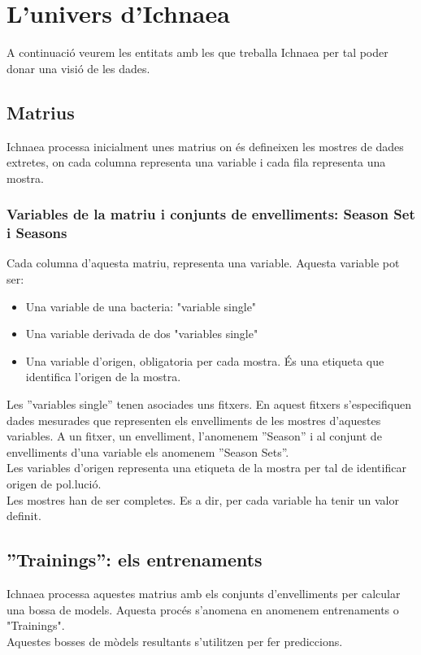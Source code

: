\section{L'univers d'Ichnaea}
A continuaci\'{o} veurem les entitats amb les que treballa Ichnaea per tal poder donar una visi\'{o} de les dades.

\subsection{Matrius}
\label{cha:backgroud:univers:matrius}
Ichnaea processa inicialment unes matrius on \'e{s} defineixen les mostres de dades extretes, on cada columna representa una variable i cada fila representa una mostra. 

\subsubsection{Variables de la matriu i conjunts de envelliments: Season Set i Seasons}
\label{cha:backgroud:univers:matrius:variables_seasons}
Cada columna d'aquesta matriu, representa una variable. Aquesta variable pot ser:\\

\begin{itemize}
\item Una variable de una bacteria: "variable single"
\item Una variable derivada de dos "variables single"
\item Una variable d'origen, obligatoria per cada mostra. \'{E}s una etiqueta que identifica l'origen de la mostra.
\end{itemize}

Les ''variables single'' tenen asociades uns fitxers. En aquest fitxers s'especifiquen dades mesurades que representen els envelliments de les mostres d'aquestes variables. A un fitxer, un envelliment, l'anomenem ''Season'' i al conjunt de envelliments d'una variable els anomenem ''Season Sets''.\\

Les variables d'origen representa una etiqueta de la mostra per tal de identificar origen de pol.luci\'{o}.\\

Les mostres han de ser completes. Es a dir, per cada variable ha tenir un valor definit.

\subsection{''Trainings'': els entrenaments}
Ichnaea processa aquestes matrius amb els conjunts d'envelliments per calcular una bossa de models. Aquesta proc\'{e}s s'anomena en anomenem entrenaments o "Trainings". \\
Aquestes bosses de m\`{o}dels resultants s'utilitzen per fer prediccions.

